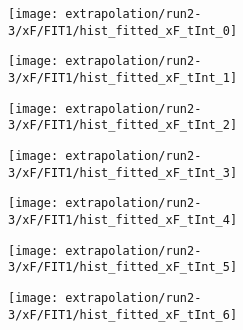 \begin{figure}
	\centering
	\caption{Fit to the flask subtracted yield ratio with FIT1 for $x_F$ for run 2-3.}
	\label{fig:run2-3_FIT1_xF}
	\begin{subfigure}{0.45\linewidth}
		\texttt{[image: extrapolation/run2-3/xF/FIT1/hist\_fitted\_xF\_tInt\_0]}
	\end{subfigure}
	\begin{subfigure}{0.45\linewidth}
		\texttt{[image: extrapolation/run2-3/xF/FIT1/hist\_fitted\_xF\_tInt\_1]}
	\end{subfigure}
	\begin{subfigure}{0.45\linewidth}
		\texttt{[image: extrapolation/run2-3/xF/FIT1/hist\_fitted\_xF\_tInt\_2]}
	\end{subfigure}
	\begin{subfigure}{0.45\linewidth}
		\texttt{[image: extrapolation/run2-3/xF/FIT1/hist\_fitted\_xF\_tInt\_3]}
	\end{subfigure}
	\begin{subfigure}{0.45\linewidth}
		\texttt{[image: extrapolation/run2-3/xF/FIT1/hist\_fitted\_xF\_tInt\_4]}
	\end{subfigure}
	\begin{subfigure}{0.45\linewidth}
		\texttt{[image: extrapolation/run2-3/xF/FIT1/hist\_fitted\_xF\_tInt\_5]}
	\end{subfigure}
	\begin{subfigure}{0.45\linewidth}
		\texttt{[image: extrapolation/run2-3/xF/FIT1/hist\_fitted\_xF\_tInt\_6]}
	\end{subfigure}
\end{figure}
